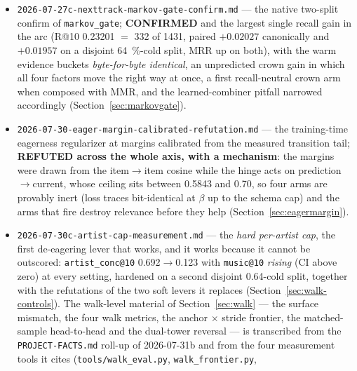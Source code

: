 \documentclass[11pt]{article}
\begin{document}
\begin{itemize}
    with its own verified/provisional partition preserved and its test-set
    screening caveat stated; its reusable content is the convergent thesis that
    every surviving proposal is an \emph{evidence-conditioning} change rather than
    a capacity change, the mechanical explanation of the learned-combiner anomaly,
    and the graveyard (Section~\ref{sec:memo}).
  \item \texttt{2026-07-27c-nexttrack-markov-gate-confirm.md} --- the native
    two-split confirm of \texttt{markov\_gate}; \textbf{CONFIRMED} and the largest
    single recall gain in the arc (R@10 \num{0.23201} $=$ \num{332} of \num{1431},
    paired $+\num{0.02027}$ canonically and $+\num{0.01957}$ on a disjoint
    \SI{64}{\percent}-cold split, MRR up on both), with the warm evidence buckets
    \emph{byte-for-byte identical}, an unpredicted crown gain in which all four
    factors move the right way at once, a first recall-neutral crown arm when
    composed with MMR, and the learned-combiner pitfall narrowed accordingly
    (Section~\ref{sec:markovgate}).
  \item \texttt{2026-07-30-eager-margin-calibrated-refutation.md} --- the
    training-time eagerness regularizer at margins calibrated from the measured
    transition tail; \textbf{REFUTED across the whole axis, with a mechanism}: the
    margins were drawn from the item$\to$item cosine while the hinge acts on
    prediction$\to$current, whose ceiling sits between \num{0.5843} and \num{0.70},
    so four arms are provably inert (loss traces bit-identical at $\beta$ up to the
    schema cap) and the arms that fire destroy relevance before they help
    (Section~\ref{sec:eagermargin}).
  \item \texttt{2026-07-30c-artist-cap-measurement.md} --- the \emph{hard
    per-artist cap}, the first de-eagering lever that works, and it works because
    it cannot be outscored: \texttt{artist\_conc@10}
    \num{0.692}$\to$\num{0.123} with \texttt{music@10} \emph{rising} (CI above
    zero) at every setting, hardened on a second disjoint 0.64-cold split,
    together with the refutations of the two soft levers it replaces
    (Section~\ref{sec:walk-controls}). The walk-level material of
    Section~\ref{sec:walk} --- the surface mismatch, the four walk metrics, the
    anchor $\times$ stride frontier, the matched-sample head-to-head and the
    dual-tower reversal --- is transcribed from the \texttt{PROJECT-FACTS.md}
    roll-up of 2026-07-31b and from the four measurement tools it cites
    (\texttt{tools/walk\_eval.py}, \texttt{walk\_frontier.py},

\end{itemize}
\end{document}
